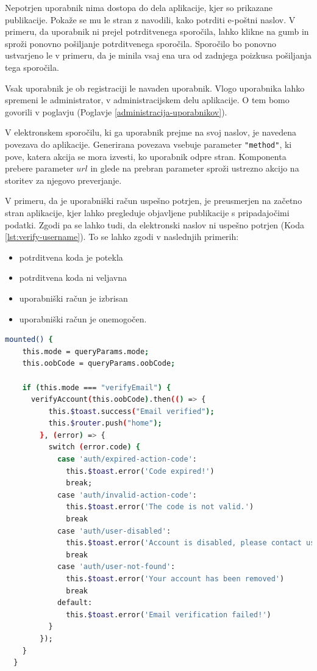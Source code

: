 \documentclass[a4paper, 12pt]{book}
\begin{document}
Nepotrjen uporabnik nima dostopa do dela aplikacije, kjer so prikazane publikacije. Pokaže se mu le stran z navodili, kako potrditi e-poštni naslov. V primeru, da uporabnik ni prejel potrditvenega sporočila, lahko klikne na gumb in sproži ponovno pošiljanje potrditvenega sporočila. Sporočilo bo ponovno ustvarjeno le v primeru, da je minila vsaj ena ura od zadnjega poizkusa pošiljanja tega sporočila.

Vsak uporabnik je ob registraciji le navaden uporabnik. Vlogo uporabnika lahko spremeni le administrator, v administracijskem delu aplikacije. O tem bomo govorili v poglavju  (Poglavje \ref{administracija-uporabnikov}).

V elektronskem sporočilu, ki ga uporabnik prejme na svoj naslov, je navedena povezava do aplikacije. Generirana povezava vsebuje parameter \verb="method"=, ki pove, katera akcija se mora izvesti, ko uporabnik odpre stran. Komponenta prebere parameter $url$ in glede na prebran parameter sproži ustrezno akcijo na storitev za njegovo preverjanje. 

V primeru, da je uporabniški račun uspešno potrjen, je preusmerjen na začetno stran aplikacije, kjer lahko pregleduje objavljene publikacije s pripadajočimi podatki. Zgodi pa se lahko tudi, da elektronski naslov ni uspešno potrjen (Koda \ref{lst:verify-username}). To se lahko zgodi v naslednjih primerih:
\begin{itemize}
  \item potrditvena koda je potekla
  \item potrditvena koda ni veljavna
  \item uporabniški račun je izbrisan
  \item uporabniški račun je onemogočen.
\end{itemize}

\begin{lstlisting}[language=bash, style=mystyle,caption={Primer kode, za preverjanje uporabnika.}, label=lst:verify-username]
  mounted() {
    this.mode = queryParams.mode;
    this.oobCode = queryParams.oobCode;

    if (this.mode === "verifyEmail") {
      verifyAccount(this.oobCode).then(() => {
          this.$toast.success("Email verified");
          this.$router.push("home");
        }, (error) => {
          switch (error.code) {
            case 'auth/expired-action-code':
              this.$toast.error('Code expired!')
              break;
            case 'auth/invalid-action-code':
              this.$toast.error('The code is not valid.')
              break
            case 'auth/user-disabled':
              this.$toast.error('Account is disabled, please contact us at support@example.com')
              break
            case 'auth/user-not-found':
              this.$toast.error('Your account has been removed')
              break
            default:
              this.$toast.error('Email verification failed!')
          }
        });
    }
  }
\end{lstlisting}
\end{document}
